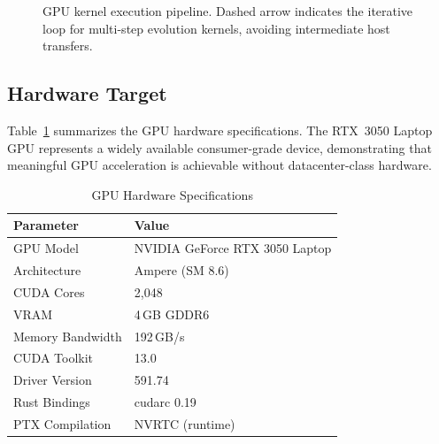 \documentclass[lettersize,journal]{IEEEtran}
\begin{document}
\begin{figure}[!t]
\centering
{}
\caption{GPU kernel execution pipeline. Dashed arrow indicates the iterative loop for multi-step evolution kernels, avoiding intermediate host transfers.}
\label{fig:pipeline}
\end{figure}

\subsection{Hardware Target}

Table~\ref{tab:hardware} summarizes the GPU hardware specifications. The RTX~3050 Laptop GPU represents a widely available consumer-grade device, demonstrating that meaningful GPU acceleration is achievable without datacenter-class hardware.

\begin{table}[!t]
\caption{GPU Hardware Specifications\label{tab:hardware}}
\centering
\begin{tabular}{@{}ll@{}}
\toprule
\textbf{Parameter} & \textbf{Value} \\
\midrule
GPU Model          & NVIDIA GeForce RTX 3050 Laptop \\
Architecture       & Ampere (SM 8.6) \\
CUDA Cores         & 2{,}048 \\
VRAM               & 4\,GB GDDR6 \\
Memory Bandwidth   & 192\,GB/s \\
CUDA Toolkit       & 13.0 \\
Driver Version     & 591.74 \\
Rust Bindings      & cudarc 0.19 \\
PTX Compilation    & NVRTC (runtime) \\
\bottomrule
\end{tabular}
\end{table}
\end{document}
